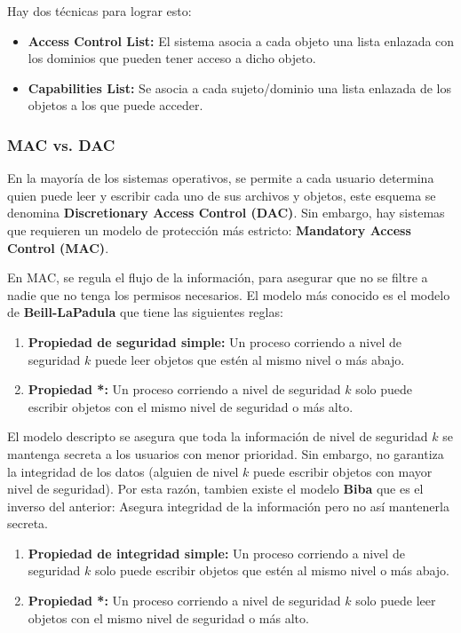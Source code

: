 Hay dos técnicas para lograr esto:

\begin{itemize}
	\item \textbf{Access Control List:} El sistema asocia a cada objeto una lista enlazada con los dominios que pueden tener acceso a dicho objeto.
	\item \textbf{Capabilities List:} Se asocia a cada sujeto/dominio una lista enlazada de los objetos a los que puede acceder.
\end{itemize}

\subsubsection{MAC vs. DAC}
En la mayoría de los sistemas operativos, se permite a cada usuario determina quien puede leer y escribir cada uno de sus archivos y objetos, este esquema se denomina \textbf{Discretionary Access Control (DAC)}. Sin embargo, hay sistemas que requieren un modelo de protección más estricto: \textbf{Mandatory Access Control (MAC)}. 

En MAC, se regula el flujo de la información, para asegurar que no se filtre a nadie que no tenga los permisos necesarios. El modelo más conocido es el modelo de \textbf{Beill-LaPadula} que tiene las siguientes reglas:

\begin{enumerate}
	\item \textbf{Propiedad de seguridad simple:} Un proceso corriendo a nivel de seguridad $k$ puede leer objetos que estén al mismo nivel o más abajo.
	\item \textbf{Propiedad *:} Un proceso corriendo a nivel de seguridad $k$ solo puede escribir objetos con el mismo nivel de seguridad o más alto.
\end{enumerate}

El modelo descripto se asegura que toda la información de nivel de seguridad $k$ se mantenga secreta a los usuarios con menor prioridad. Sin embargo, no garantiza la integridad de los datos (alguien de nivel $k$ puede escribir objetos con mayor nivel de seguridad). Por esta razón, tambien existe el modelo \textbf{Biba} que es el inverso del anterior: Asegura integridad de la información pero no así mantenerla secreta.

\begin{enumerate}
	\item \textbf{Propiedad de integridad simple:} Un proceso corriendo a nivel de seguridad $k$ solo puede escribir objetos que estén al mismo nivel o más abajo.
	\item \textbf{Propiedad *:} Un proceso corriendo a nivel de seguridad $k$ solo puede leer objetos con el mismo nivel de seguridad o más alto.
\end{enumerate}

